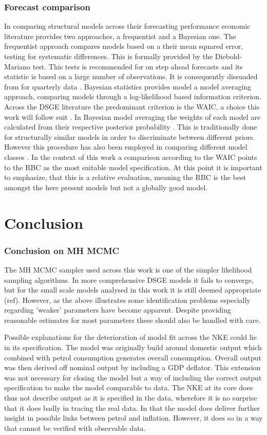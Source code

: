 \documentclass[12pt,a4paper,english]{article} %
\let\oldsection\section
\renewcommand\section{\clearpage\oldsection}
\begin{document}
	\subsubsection{Forecast comparison}
	In comparing structural models across their forecasting performance economic literature provides two approaches, a frequentist and a Bayesian one. The frequentist approach compares models based on a their mean squared error, testing for systematic differences. This is formally provided by the Diebold-Mariano test. This tests is recommended for on step ahead forecasts and its statistic is based on a large number of observations. It is consequently dissuaded from for quarterly data \cite{chin_bayesian_2019}. Bayesian statistics provides model a model averaging approach, comparing models through a log-likelihood based information criterion. Across the DSGE literature the predominant criterion is the \ac{WAIC}, a choice this work will follow suit \cite{chin_bayesian_2019}. In Bayesian model averaging the weights of each model are calculated from their respective posterior probability \cite{chin_bayesian_2019}. This is traditionally done for structurally similar models in order to discriminate between different priors. However this procedure has also been employed in comparing different model classes \cite{chin_bayesian_2019}. In the context of this work a comparison according to the \ac{WAIC} points to the RBC as the most suitable model specification. At this point it is important to emphasize, that this is a relative evaluation, meaning the RBC is the best amongst the here present models but not a globally good model.
	
	\section{Conclusion}
	\subsubsection{Conclusion on MH MCMC}
	The MH MCMC sampler used across this work is one of the simpler likelihood sampling algorithms. In more comprehensive DSGE models it fails to converge, but for the small scale models analysed in this work it is still deemed appropriate (ref). However, as the above illustrates some identification problems especially regarding 'weaker' parameters have become apparent. Despite providing reasonable estimates for most parameters these should also be handled with care. 
	
	Possible explanations for the deterioration of model fit across the NKE could lie in its specification. The model was originally build around domestic output which combined with petrol consumption generates overall consumption. Overall output was then derived off nominal output by including a GDP deflator. This extension was not necessary for closing the model but a way of including the correct output specification to make the model comparable to data. The NKE at its core does thus not describe output as it is specified in the data, wherefore it is no surprise that it does badly in tracing the real data. In that the model does deliver further insight in possible links between petrol and inflation. However, it does so in a way that cannot be verified with observable data.
	
\end{document}

